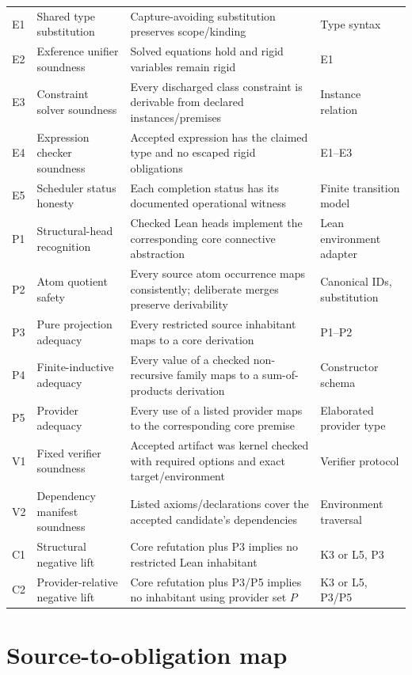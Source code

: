 \documentclass[11pt,letterpaper,openany]{report}
\theoremstyle{definition}
\theoremstyle{remark}
\begin{document}
\begin{longtable}{L{0.07\textwidth} L{0.235\textwidth} L{0.365\textwidth} L{0.19\textwidth}}
E1 & Shared type substitution & Capture-avoiding substitution preserves scope/kinding & Type syntax \\
E2 & Exference unifier soundness & Solved equations hold and rigid variables remain rigid & E1 \\
E3 & Constraint solver soundness & Every discharged class constraint is derivable from declared instances/premises & Instance relation \\
E4 & Expression checker soundness & Accepted expression has the claimed type and no escaped rigid obligations & E1--E3 \\
E5 & Scheduler status honesty & Each completion status has its documented operational witness & Finite transition model \\
P1 & Structural-head recognition & Checked Lean heads implement the corresponding core connective abstraction & Lean environment adapter \\
P2 & Atom quotient safety & Every source atom occurrence maps consistently; deliberate merges preserve derivability & Canonical IDs, substitution \\
P3 & Pure projection adequacy & Every restricted source inhabitant maps to a core derivation & P1--P2 \\
P4 & Finite-inductive adequacy & Every value of a checked non-recursive family maps to a sum-of-products derivation & Constructor schema \\
P5 & Provider adequacy & Every use of a listed provider maps to the corresponding core premise & Elaborated provider type \\
V1 & Fixed verifier soundness & Accepted artifact was kernel checked with required options and exact target/environment & Verifier protocol \\
V2 & Dependency manifest soundness & Listed axioms/declarations cover the accepted candidate's dependencies & Environment traversal \\
C1 & Structural negative lift & Core refutation plus P3 implies no restricted Lean inhabitant & K3 or L5, P3 \\
C2 & Provider-relative negative lift & Core refutation plus P3/P5 implies no inhabitant using provider set \(P\) & K3 or L5, P3/P5 \\
\bottomrule
\end{longtable}

\chapter{Source-to-obligation map}
\label{ch:source-map}
\end{document}
